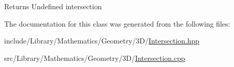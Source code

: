 \begin{DoxyReturn}{Returns}
Undefined intersection 
\end{DoxyReturn}


The documentation for this class was generated from the following files\+:\begin{DoxyCompactItemize}
\item 
include/\+Library/\+Mathematics/\+Geometry/3\+D/\hyperlink{_intersection_8hpp}{Intersection.\+hpp}\item 
src/\+Library/\+Mathematics/\+Geometry/3\+D/\hyperlink{_intersection_8cpp}{Intersection.\+cpp}\end{DoxyCompactItemize}
